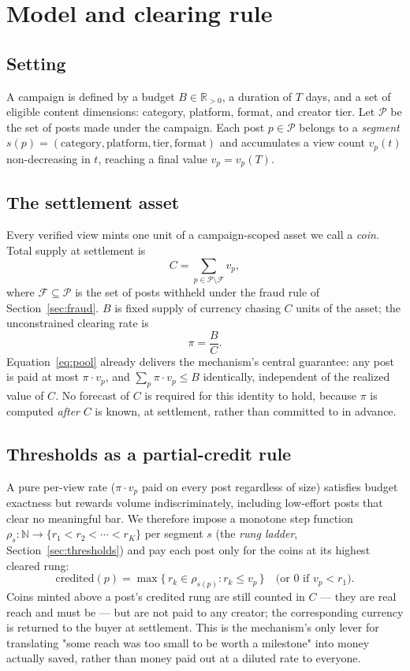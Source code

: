 \documentclass[11pt]{article}
\begin{document}
\section{Model and clearing rule}
\label{sec:model}

\subsection{Setting}

A campaign is defined by a budget $B \in \mathbb{R}_{>0}$, a duration of $T$ days, and a set of
eligible content dimensions: category, platform, format, and creator tier. Let $\mathcal{P}$ be the
set of posts made under the campaign. Each post $p \in \mathcal{P}$ belongs to a \emph{segment}
$s(p) = (\text{category}, \text{platform}, \text{tier}, \text{format})$ and accumulates a view
count $v_p(t)$ non-decreasing in $t$, reaching a final value $v_p = v_p(T)$.

\subsection{The settlement asset}

Every verified view mints one unit of a campaign-scoped asset we call a \emph{coin}. Total supply
at settlement is
$$
C = \sum_{p \in \mathcal{P} \setminus \mathcal{F}} v_p ,
$$
where $\mathcal{F} \subseteq \mathcal{P}$ is the set of posts withheld under the fraud rule of
Section~\ref{sec:fraud}. $B$ is fixed supply of currency chasing $C$ units of the asset; the
unconstrained clearing rate is
$$
\pi = \frac{B}{C}. \label{eq:pool}
$$
Equation~\eqref{eq:pool} already delivers the mechanism's central guarantee: any post is paid at
most $\pi \cdot v_p$, and $\sum_p \pi \cdot v_p \le B$ identically, independent of the realized
value of $C$. No forecast of $C$ is required for this identity to hold, because $\pi$ is computed
\emph{after} $C$ is known, at settlement, rather than committed to in advance.

\subsection{Thresholds as a partial-credit rule}

A pure per-view rate ($\pi \cdot v_p$ paid on every post regardless of size) satisfies budget
exactness but rewards volume indiscriminately, including low-effort posts that clear no meaningful
bar. We therefore impose a monotone step function $\rho_s : \mathbb{N} \to \{r_1 < r_2 < \cdots <
r_K\}$ per segment $s$ (the \emph{rung ladder}, Section~\ref{sec:thresholds}) and pay each post only
for the coins at its highest cleared rung:
$$
\text{credited}(p) = \max\{\, r_k \in \rho_{s(p)} : r_k \le v_p \,\} \quad \text{(or } 0 \text{ if } v_p < r_1 \text{)}.
$$
Coins minted above a post's credited rung are still counted in $C$ — they are real reach and must
be — but are not paid to any creator; the corresponding currency is returned to the buyer at
settlement. This is the mechanism's only lever for translating "some reach was too small to be
worth a milestone" into money actually saved, rather than money paid out at a diluted rate to
everyone.
\end{document}
